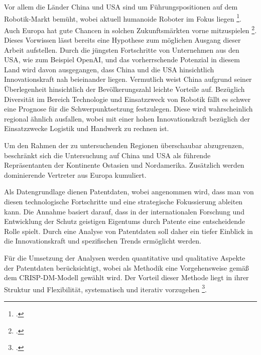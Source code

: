 Vor allem die Länder China und USA sind um Führungspositionen auf dem Robotik-Markt bemüht, wobei aktuell humanoide Roboter im Fokus liegen \footcite{chinavsusa}. Auch Europa hat gute Chancen in solchen Zukunftsmärkten vorne mitzuspielen \footcite{gervsusa}. Dieses Vorwissen lässt bereits eine Hypothese zum möglichen Ausgang dieser Arbeit aufstellen. Durch die jüngsten Fortschritte von Unternehmen aus den USA, wie zum Beispiel OpenAI, und das vorherrschende Potenzial in diesem Land wird davon ausgegangen, dass China und die USA hinsichtlich Innovationskraft nah beieinander liegen. Vermutlich weist China aufgrund seiner Überlegenheit hinsichtlich der Bevölkerungszahl leichte Vorteile auf. Bezüglich Diversität im Bereich Technologie und Einsatzzweck von Robotik fällt es schwer eine Prognose für die Schwerpunktsetzung festzulegen. Diese wird wahrscheinlich regional ähnlich ausfallen, wobei mit einer hohen Innovationskraft bezüglich der Einsatzzwecke Logistik und Handwerk zu rechnen ist.

Um den Rahmen der zu untersuchenden Regionen überschaubar abzugrenzen, beschränkt sich die Untersuchung auf China und USA als führende Repräsentanten der Kontinente Ostasien und Nordamerika. Zusätzlich werden dominierende Vertreter aus Europa kumuliert.

Als Datengrundlage dienen Patentdaten, wobei angenommen wird, dass man von diesen technologische Fortschritte und eine strategische Fokussierung ableiten kann. Die Annahme basiert darauf, dass in der internationalen Forschung und Entwicklung der Schutz geistigen Eigentums durch Patente eine entscheidende Rolle spielt. Durch eine Analyse von Patentdaten soll daher ein tiefer Einblick in die Innovationskraft und spezifischen Trends ermöglicht werden.

Für die Umsetzung der Analysen werden quantitative und qualitative Aspekte der Patentdaten berücksichtigt, wobei als Methodik eine Vorgehensweise gemäß dem \ac{CRISP-DM}-Modell gewählt wird. Der Vorteil dieser Methode liegt in ihrer Struktur und Flexibilität, systematisch und iterativ vorzugehen \footcite{website:ibm_crispdm}.





